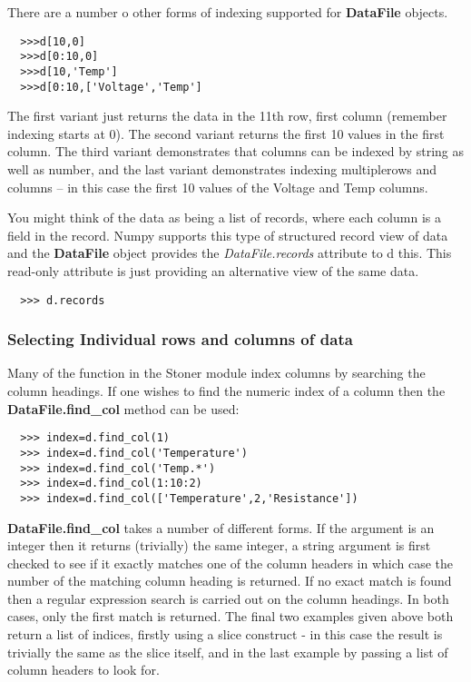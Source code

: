 \documentclass[a4paper,11pt]{scrartcl}
\begin{document}
There are a number o other forms of indexing supported for \textbf{DataFile}
objects.

\begin{verbatim}
  >>>d[10,0]
  >>>d[0:10,0]
  >>>d[10,'Temp']
  >>>d[0:10,['Voltage','Temp']
\end{verbatim}

The first variant just returns the data in the 11th row, first column (remember
indexing starts at 0). The second variant returns the first 10 values in the
first column. The third variant demonstrates that columns can be indexed by
string as well as number, and the last variant demonstrates indexing
multiplerows and columns -- in this case the first 10 values of the Voltage and
Temp columns.

You might think of the data as being a list of records, where each column is a
field in the record. Numpy supports this type of structured record view of data
and the \textbf{DataFile} object provides the \textit{DataFile.records}
attribute to d this. This read-only attribute is just providing an alternative
view of the same data.

\begin{verbatim}
  >>> d.records
\end{verbatim}

\subsubsection{Selecting Individual rows and columns of data}

Many of the function in the Stoner module index columns by searching the column
headings. If one wishes to find the numeric index of a column then the
\textbf{DataFile.find\_col} method can be used:

\begin{verbatim}
  >>> index=d.find_col(1)
  >>> index=d.find_col('Temperature')
  >>> index=d.find_col('Temp.*')
  >>> index=d.find_col(1:10:2)
  >>> index=d.find_col(['Temperature',2,'Resistance'])
\end{verbatim}

 \textbf{DataFile.find\_col} takes a number of different forms. If the argument
is an integer then it returns (trivially) the same integer, a string argument is
first checked to see if it exactly matches one of the column headers in which
case the number of the matching column heading is returned. If no exact match is
found then a regular expression search is carried out on the column headings. In
both cases, only the first match is returned. The final two examples given above
both return a list of indices, firstly using a slice construct - in this case
the result is trivially the same as the slice itself, and in the last example by
passing a list of column headers to look for.
\end{document}
